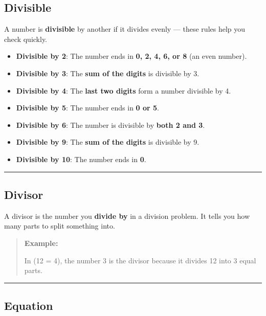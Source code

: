 \documentclass[
  letterpaper,
  DIV=11,
  numbers=noendperiod]{scrreprt}
\providecommand{\tightlist}{%
  \setlength{\itemsep}{0pt}\setlength{\parskip}{0pt}}
\begin{document}
\subsection*{Divisible}\label{glossary-divisible}

A number is \textbf{divisible} by another if it divides evenly --- these
rules help you check quickly.

\begin{itemize}
\tightlist
\item
  \textbf{Divisible by 2}: The number ends in \textbf{0, 2, 4, 6, or 8}
  (an even number).
\item
  \textbf{Divisible by 3}: The \textbf{sum of the digits} is divisible
  by 3.
\item
  \textbf{Divisible by 4}: The \textbf{last two digits} form a number
  divisible by 4.
\item
  \textbf{Divisible by 5}: The number ends in \textbf{0 or 5}.
\item
  \textbf{Divisible by 6}: The number is divisible by \textbf{both 2 and
  3}.
\item
  \textbf{Divisible by 9}: The \textbf{sum of the digits} is divisible
  by 9.
\item
  \textbf{Divisible by 10}: The number ends in \textbf{0}.
\end{itemize}

\begin{center}\rule{0.5\linewidth}{0.5pt}\end{center}

\subsection*{Divisor}\label{glossary-divisor}

A divisor is the number you \textbf{divide by} in a division problem. It
tells you how many parts to split something into.

\begin{quote}
\textbf{Example:}

In (12  = 4), the number 3 is the divisor because it divides 12
into 3 equal parts.
\end{quote}

\begin{center}\rule{0.5\linewidth}{0.5pt}\end{center}

\subsection*{Equation}\label{glossary-equation}
\end{document}
